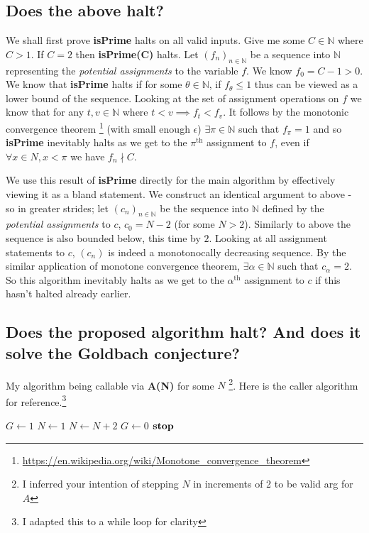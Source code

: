 \documentclass{article}
\begin{document}
\subsection{Does the above halt?}
We shall first prove \textbf{isPrime} halts on all valid inputs. Give me some $C \in \mathbb{N}$ where $C>1$. If $C=2$ then \textbf{isPrime(C)} halts. Let $(f_n)_{n\in\mathbb{N}}$ be a sequence into $\mathbb{N}$ representing the \emph{potential assignments} to the variable $f$. We know $f_0 = C - 1 > 0$. We know that \textbf{isPrime} halts if for some $\theta \in \mathbb{N}$, if $f_{\theta} \leq 1$ thus can be viewed as a lower bound of the sequence. Looking at the set of assignment operations on $f$ we know that for any $t,v \in \mathbb{N}$ where $t < v \implies f_t < f_v$. It follows by the monotonic convergence theorem \footnote{\url{https://en.wikipedia.org/wiki/Monotone_convergence_theorem}} (with small enough $\epsilon$) $\exists \pi \in \mathbb{N}$ such that $f_{\pi} = 1$ and so \textbf{isPrime} inevitably halts as we get to the $\pi^{\text{th}}$ assignment to $f$, even if $\forall x \in N, x< \pi$ we have $f_n \nmid C$.

We use this result of \textbf{isPrime} directly for the main algorithm by effectively viewing it as a bland statement. We construct an identical argument to above - so in greater strides; let $(c_n)_{n\in\mathbb{N}}$ be the sequence into $\mathbb{N}$ defined by the \emph{potential assignments} to $c$, $c_0 = N - 2$ (for some $N > 2$). Similarly to above the sequence is also bounded below, this time by $2$. Looking at all assignment statements to $c$, $(c_n)$ is indeed a monotonocally decreasing sequence. By the similar application of monotone convergence theorem, $\exists \alpha \in \mathbb{N}$ such that $c_{\alpha} = 2$. So this algorithm inevitably halts as we get to the $\alpha^{\text{th}}$ assignment to $c$ if this hasn't halted already earlier.

\pagebreak
\subsection{Does the proposed algorithm halt? And does it solve the Goldbach conjecture?}
My algorithm being callable via \textbf{A(N)} for some $N$ \footnote{I inferred your intention of stepping $N$ in increments of 2 to be valid arg for $A$}. Here is the caller algorithm for reference.\footnote{I adapted this to a while loop for clarity}


\begin{algorithmic}[1]
	\STATE $G \leftarrow 1$
	\STATE $N \leftarrow 1$
			\STATE $N \leftarrow N + 2$
		\ENDWHILE
		\STATE $G \leftarrow 0$
	\STATE $\text{\textbf{stop}}$ 
\end{algorithmic}
\end{document}
